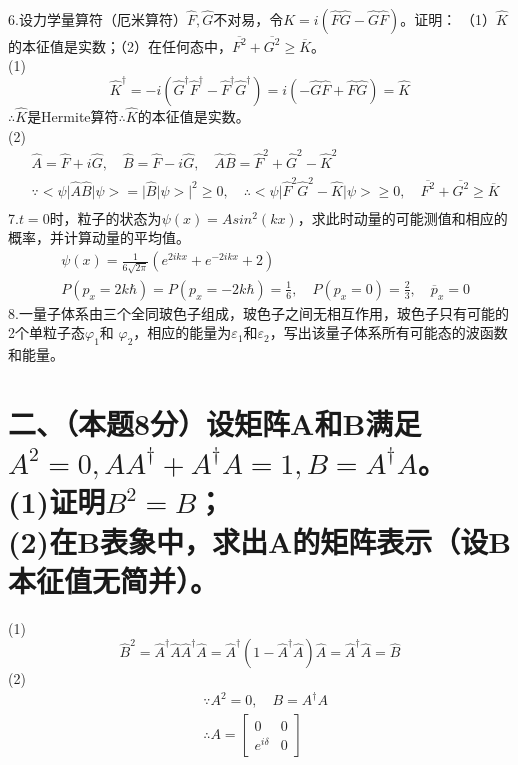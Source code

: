 \documentclass[UTF8]{ctexart}
\begin{document}
6.设力学量算符（厄米算符）$\hat F,\hat G$不对易，令$K=i(\hat F\hat G-\hat G\hat F)$。证明：
（1）$\hat K$的本征值是实数；（2）在任何态中，$\overline{F^2}+\overline{G^2}\geq\overline{K}$。\\
(1)
\begin{equation*}
  \hat K^\dagger=-i(\hat G^\dagger\hat F^\dagger-\hat F^\dagger\hat G^\dagger)
  =i(-\hat G\hat F+\hat F \hat G)=\hat K
\end{equation*}
$\therefore\hat K$是Hermite算符$\therefore\hat K$的本征值是实数。\\
(2)
\begin{equation*}
  \begin{aligned}
     & \hat A=\hat F+i\hat G,\quad\hat B=\hat F-i\hat G,\quad\hat A\hat B=\hat F^2+\hat G^2-\hat K^2 \\
     & \because <\psi\lvert\hat A\hat B\rvert\psi>=\lvert\hat B\lvert\psi>\rvert^2\geq0,\quad
    \therefore<\psi\lvert\hat F^2\hat G^2-\hat K\rvert\psi>\geq0,\quad
    \overline{F^2}+\overline{G^2}\geq\overline{K}                                                    \\
  \end{aligned}
\end{equation*}
7.$t=0$时，粒子的状态为$\psi(x)=Asin^2(kx)$，求此时动量的可能测值和相应的概率，并计算动量的平均值。\\
\begin{equation*}
  \begin{aligned}
     & \psi(x)=\frac{1}{6\sqrt{2\pi}}(e^{2ikx}+e^{-2ikx}+2)                                        \\
     & P(p_x=2k\hbar)=P(p_x=-2k\hbar)=\frac{1}{6},\quad P(p_x=0)=\frac{2}{3},\quad\overline{p}_x=0
  \end{aligned}
\end{equation*}
8.一量子体系由三个全同玻色子组成，玻色子之间无相互作用，玻色子只有可能的2个单粒子态$\varphi_1$和
$\varphi_2$，相应的能量为$\varepsilon_1$和$\varepsilon_2$，写出该量子体系所有可能态的波函数和能量。\\
\section*{二、（本题8分）设矩阵A和B满足$A^2=0,AA^\dagger+A^\dagger A=1,B=A^\dagger A$。\\
  (1)证明$B^2=B$；\\
  (2)在B表象中，求出A的矩阵表示（设B本征值无简并）。}
 (1)
\begin{equation*}
  \hat B^2=\hat A^\dagger\hat A\hat A^\dagger\hat A=\hat A^\dagger(1-\hat A^\dagger\hat A)\hat A
  =\hat A^\dagger\hat A=\hat B
\end{equation*}
(2)
\begin{equation*}
  \begin{aligned}
     & \because A^2=0,\quad B=A^\dagger A \\
     & \therefore A=
    \begin{bmatrix}
      0           & 0 \\
      e^{i\delta} & 0
    \end{bmatrix}
  \end{aligned}
\end{equation*}
\end{document}
